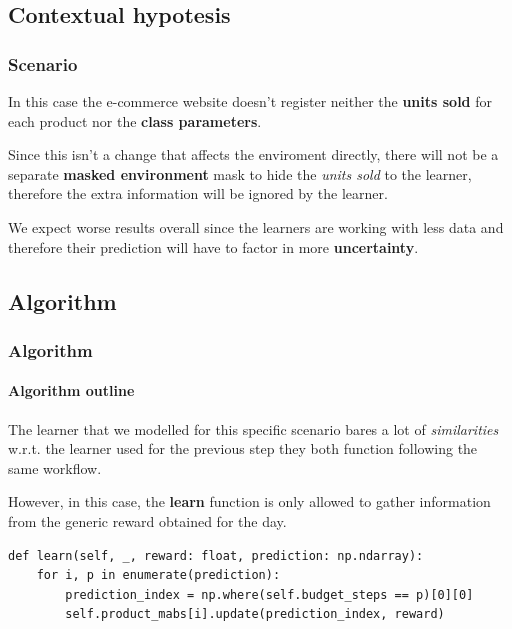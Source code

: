 
\subsection{Contextual hypotesis}


\begin{frame}

\frametitle{Scenario}

In this case the e-commerce website doesn't register neither the \textbf{units sold} for each product nor the \textbf{class parameters}.

Since this isn't a change that affects the enviroment directly, there will not be a separate \textbf{masked environment} mask to hide the \textit{units sold} to the learner, therefore the extra information will be ignored by the learner.

We expect worse results overall since the learners are working with less data and therefore their prediction will have to factor in more \textbf{uncertainty}.

\end{frame}


\subsection{Algorithm}


\begin{frame}[fragile]

\frametitle{Algorithm}
\framesubtitle{Algorithm outline}

The learner that we modelled for this specific scenario bares a lot of \textit{similarities} w.r.t. the learner used for the previous step they both function following the same workflow.

However, in this case, the \textbf{learn} function is only allowed to gather information from the generic reward obtained for the day.

\vspace*{1em}

\begin{lstlisting}[style=Python, basicstyle=\tiny, numbers=none]
def learn(self, _, reward: float, prediction: np.ndarray):
	for i, p in enumerate(prediction):
		prediction_index = np.where(self.budget_steps == p)[0][0]
		self.product_mabs[i].update(prediction_index, reward)
\end{lstlisting}

\end{frame}

